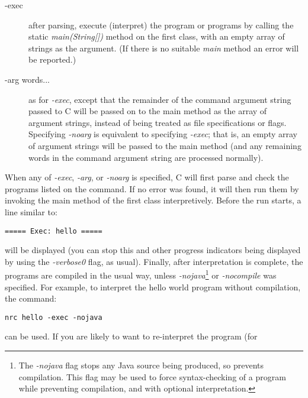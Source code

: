 \begin{description}
\item[-exec]
after parsing, execute (interpret) the program or programs by calling
the static \emph{main(String[])} method on the first class, with an
empty array of strings as the argument.  (If there is no suitable \emph{main}
method an error will be reported.)
\item[-arg words...]
as for \emph{-exec}, except that the remainder of the command argument
string passed to \nr{}C will be passed on to the main method as the
array of argument strings, instead of being treated as file
specifications or flags.  Specifying \emph{-noarg} is equivalent to
specifying \emph{-exec}; that is, an empty array of argument strings
will be passed to the main method (and any remaining words in the
command argument string are processed normally).
\end{description}
When any of \emph{-exec}, \emph{-arg}, or \emph{-noarg} is specified,
\nr{}C will first parse and check the programs listed on the command.
If no error was found, it will then run them by invoking the main method
of the first class interpretively.
\newline
Before the run starts, a line similar to:
\begin{verbatim}
===== Exec: hello =====
\end{verbatim}
will be displayed (you can stop this and other progress indicators being
displayed by using the \emph{-verbose0} flag, as usual).
\newline
{}
Finally, after interpretation is complete, the programs are compiled in
the usual way, unless \emph{-nojava}\footnote{The \emph{-nojava} flag stops any Java source being produced, so
prevents compilation.  This flag may be used to force syntax-checking of
a program while preventing compilation, and with optional
interpretation.}
or \emph{-nocompile} was specified.
\newline
For example, to interpret the hello world program without
compilation, the command:
\begin{verbatim}
nrc hello -exec -nojava
\end{verbatim}
can be used.  If you are likely to want to re-interpret the program (for
